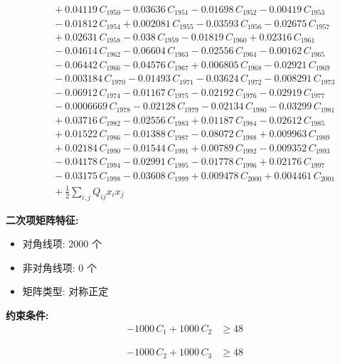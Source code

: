 \documentclass[a4paper,11pt]{article}
\begin{document}
\begin{align}
&\quad + 0.04119\,C_{1950} - 0.03636\,C_{1951} - 0.01698\,C_{1952} - 0.00419\,C_{1953} \nonumber\\
&\quad - 0.01812\,C_{1954} + 0.002081\,C_{1955} - 0.03593\,C_{1956} - 0.02675\,C_{1957} \nonumber\\
&\quad + 0.02631\,C_{1958} - 0.038\,C_{1959} - 0.01819\,C_{1960} + 0.02316\,C_{1961} \nonumber\\
&\quad - 0.04614\,C_{1962} - 0.06604\,C_{1963} - 0.02556\,C_{1964} - 0.00162\,C_{1965} \nonumber\\
&\quad - 0.06442\,C_{1966} - 0.04576\,C_{1967} + 0.006805\,C_{1968} - 0.02921\,C_{1969} \nonumber\\
&\quad - 0.003184\,C_{1970} - 0.01493\,C_{1971} - 0.03624\,C_{1972} - 0.008291\,C_{1973} \nonumber\\
&\quad - 0.06912\,C_{1974} - 0.01167\,C_{1975} - 0.02192\,C_{1976} - 0.02919\,C_{1977} \nonumber\\
&\quad - 0.0006669\,C_{1978} - 0.02128\,C_{1979} - 0.02134\,C_{1980} - 0.03299\,C_{1981} \nonumber\\
&\quad + 0.03716\,C_{1982} - 0.02556\,C_{1983} + 0.01187\,C_{1984} - 0.02612\,C_{1985} \nonumber\\
&\quad + 0.01522\,C_{1986} - 0.01388\,C_{1987} - 0.08072\,C_{1988} + 0.009963\,C_{1989} \nonumber\\
&\quad + 0.02184\,C_{1990} - 0.01544\,C_{1991} + 0.00789\,C_{1992} - 0.009352\,C_{1993} \nonumber\\
&\quad - 0.04178\,C_{1994} - 0.02991\,C_{1995} - 0.01778\,C_{1996} + 0.02176\,C_{1997} \nonumber\\
&\quad - 0.03175\,C_{1998} - 0.03608\,C_{1999} + 0.009478\,C_{2000} + 0.004461\,C_{2001} \nonumber\\
&\quad + \frac{1}{2} \sum_{i,j} Q_{ij} x_i x_j\label{eq:objective}
\end{align}

\textbf{二次项矩阵特征:}
\begin{itemize}
\item 对角线项: 2000 个
\item 非对角线项: 0 个
\item 矩阵类型: 对称正定
\end{itemize}

\textbf{约束条件:}
\begin{align}
-1000\,C_{1} + 1000\,C_{2} &\geq 48 \nonumber
\end{align}

\begin{align}
-1000\,C_{2} + 1000\,C_{3} &\geq 48 \nonumber
\end{align}
\end{document}
